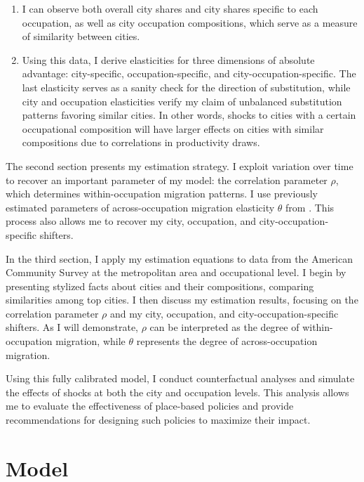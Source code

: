 \documentclass[10pt]{article}
\begin{document}
\begin{enumerate}
    \item I can observe both overall city shares and city shares specific to each occupation, as well as city occupation compositions, which serve as a measure of similarity between cities.
    \item Using this data, I derive elasticities for three dimensions of absolute advantage: city-specific, occupation-specific, and city-occupation-specific. The last elasticity serves as a sanity check for the direction of substitution, while city and occupation elasticities verify my claim of unbalanced substitution patterns favoring similar cities. In other words, shocks to cities with a certain occupational composition will have larger effects on cities with similar compositions due to correlations in productivity draws.
\end{enumerate}

The second section presents my estimation strategy. I exploit variation over time to recover an important parameter of my model: the correlation parameter $\rho$, which determines within-occupation migration patterns. I use previously estimated parameters of across-occupation migration elasticity $\theta$ from \cite{redding}. This process also allows me to recover my city, occupation, and city-occupation-specific shifters.

In the third section, I apply my estimation equations to data from the American Community Survey at the metropolitan area and occupational level. I begin by presenting stylized facts about cities and their compositions, comparing similarities among top cities. I then discuss my estimation results, focusing on the correlation parameter $\rho$ and my city, occupation, and city-occupation-specific shifters. As I will demonstrate, $\rho$ can be interpreted as the degree of within-occupation migration, while $\theta$ represents the degree of across-occupation migration.

Using this fully calibrated model, I conduct counterfactual analyses and simulate the effects of shocks at both the city and occupation levels. This analysis allows me to evaluate the effectiveness of place-based policies and provide recommendations for designing such policies to maximize their impact.

\section{Model}
\end{document}

